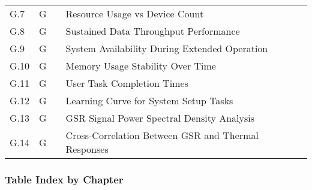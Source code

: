 \begin{longtable}{|l|l|l|p{6cm}|}
G.7 & G & \pageref{fig:scalability_resources} & Resource Usage vs Device Count \\
G.8 & G & \pageref{fig:throughput_performance} & Sustained Data Throughput Performance \\
G.9 & G & \pageref{fig:system_uptime} & System Availability During Extended Operation \\
G.10 & G & \pageref{fig:memory_stability} & Memory Usage Stability Over Time \\
G.11 & G & \pageref{fig:user_task_times} & User Task Completion Times \\
G.12 & G & \pageref{fig:learning_curve} & Learning Curve for System Setup Tasks \\
G.13 & G & \pageref{fig:gsr_frequency_analysis} & GSR Signal Power Spectral Density Analysis \\
G.14 & G & \pageref{fig:cross_correlation} & Cross-Correlation Between GSR and Thermal Responses \\
\hline
\end{longtable}

\subsubsection{Table Index by Chapter}

